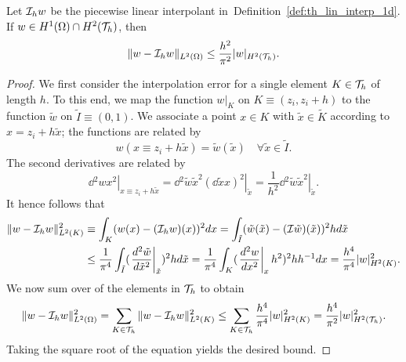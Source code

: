 \begin{proposition}
  \label{prop:th_lin_interp_L2}
  Let $\mathcal{I}_h w$ be the piecewise linear interpolant in~Definition~\ref{def:th_lin_interp_1d}. If $w \in H^1(\Omega) \cap H^2(\mathcal{T}_h)$, then
  \begin{equation*}
    \| w - \mathcal{I}_h w \|_{L^2(\Omega)}
    \leq \frac{h^2}{\pi^2} | w |_{H^2(\mathcal{T}_h)}.
  \end{equation*}
  \begin{proof}
    We first consider the interpolation error for a single element $K \in \mathcal{T}_h$ of length $h$. To this end, we map the function $w|_K$ on $K \equiv (z_i,z_i+h)$ to the function $\tilde w$ on $\tilde I \equiv (0,1)$. We associate a point $x \in K$ with $\tilde x \in \tilde K$ according to $x = z_i + h \tilde x$; the functions are related by
    \begin{equation*}
      w(x \equiv z_i + h \tilde x) = \tilde w(\tilde x) \quad \forall \tilde x \in \tilde I.
    \end{equation*}
    The second derivatives are related by
    \begin{equation*}
      \left. \dd{^2 w}{x^2} \right|_{x \equiv z_i + h \tilde x}
      = \left. \dd{^2 \tilde w}{\tilde x^2} \left( \dd{\tilde x}{x} \right)^2\right|_{\tilde x}
      = \frac{1}{h^2} \left. \dd{^2 \tilde w}{\tilde x^2} \right|_{\tilde x}.
    \end{equation*}
    It hence follows that
    \begin{align*}
      \| w - \mathcal{I}_h w \|_{L^2(K)}^2
      &\equiv
      \int_{K} ( w(x) - (\mathcal{I}_h w)(x) )^2 dx
      =
      \int_{\tilde I} (\tilde w(\tilde x) - (\mathcal{I} \tilde w)(\tilde x))^2 h d \tilde x
      \\
      &\leq
      \frac{1}{\pi^4} \int_{\tilde I} (\left. \frac{d ^2\tilde w}{d \tilde x^2} \right|_{\tilde x})^2 h d \tilde x
      =
      \frac{1}{\pi^4} \int_{K} (\left. \frac{d ^2 w}{d x^2} \right|_x h^2 )^2 h h^{-1} d x
      = \frac{h^4}{\pi^4} | w |_{H^2(K)}^2.
    \end{align*}
    We now sum over of the elements in $\mathcal{T}_h$ to obtain
    \begin{equation*}
      \| w - \mathcal{I}_h w \|_{L^2(\Omega)}^2
      =
      \sum_{K \in \mathcal{T}_h} \| w - \mathcal{I}_h w \|_{L^2(K)}^2
      \leq
      \sum_{K \in \mathcal{T}_h} \frac{h^4}{\pi^4} | w |^2_{H^2(K)}
      = \frac{h^4}{\pi^2} | w |^2_{H^2(\mathcal{T}_h)}.
    \end{equation*}
    Taking the square root of the equation yields the desired bound.
  \end{proof}
\end{proposition}
